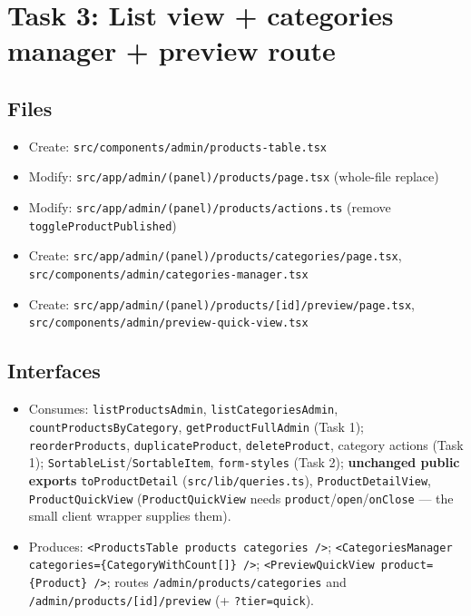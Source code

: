 \documentclass[11pt,a4paper]{article}
\begin{document}
\section{Task 3: List view + categories manager + preview route}

\subsection*{Files}
\begin{itemize}
  \item Create: \texttt{src/components/admin/products-table.tsx}
  \item Modify: \texttt{src/app/admin/(panel)/products/page.tsx} (whole-file replace)
  \item Modify: \texttt{src/app/admin/(panel)/products/actions.ts} (remove
        \texttt{toggleProductPublished})
  \item Create: \texttt{src/app/admin/(panel)/products/categories/page.tsx},
        \texttt{src/components/admin/categories-manager.tsx}
  \item Create: \texttt{src/app/admin/(panel)/products/[id]/preview/page.tsx},
        \texttt{src/components/admin/preview-quick-view.tsx}
\end{itemize}

\subsection*{Interfaces}
\begin{itemize}
  \item Consumes: \texttt{listProductsAdmin}, \texttt{listCategoriesAdmin},
        \texttt{countProductsByCategory}, \texttt{getProductFullAdmin} (Task 1);
        \texttt{reorderProducts}, \texttt{duplicateProduct}, \texttt{deleteProduct}, category actions
        (Task 1); \texttt{SortableList}/\texttt{SortableItem}, \texttt{form-styles} (Task 2);
        \textbf{unchanged public exports} \texttt{toProductDetail} (\texttt{src/lib/queries.ts}),
        \texttt{ProductDetailView}, \texttt{ProductQuickView} (\texttt{ProductQuickView} needs
        \texttt{product}/\texttt{open}/\texttt{onClose} --- the small client wrapper supplies them).
  \item Produces: \lstinline!<ProductsTable products categories />!;
        \lstinline!<CategoriesManager categories={CategoryWithCount[]} />!;
        \lstinline!<PreviewQuickView product={Product} />!; routes
        \texttt{/admin/products/categories} and \texttt{/admin/products/[id]/preview} (+
        \texttt{?tier=quick}).
\end{itemize}
\end{document}
